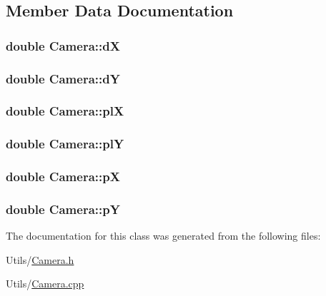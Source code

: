 \subsection{Member Data Documentation}
\hypertarget{classCamera_a3d9d9b2077ddfcd90eb887f0fa472986}{
\subsubsection[{d\-X}]{\setlength{\rightskip}{0pt plus 5cm}double Camera\-::d\-X}}\label{classCamera_a3d9d9b2077ddfcd90eb887f0fa472986}
\hypertarget{classCamera_a21a394585a8f656fbe39c06575afa62e}{
\subsubsection[{d\-Y}]{\setlength{\rightskip}{0pt plus 5cm}double Camera\-::d\-Y}}\label{classCamera_a21a394585a8f656fbe39c06575afa62e}
\hypertarget{classCamera_a724db0b967f04e90c0c17c8fd9301d43}{
\subsubsection[{pl\-X}]{\setlength{\rightskip}{0pt plus 5cm}double Camera\-::pl\-X}}\label{classCamera_a724db0b967f04e90c0c17c8fd9301d43}
\hypertarget{classCamera_a34e29ef2ecb4a278a91aec6db4e9f412}{
\subsubsection[{pl\-Y}]{\setlength{\rightskip}{0pt plus 5cm}double Camera\-::pl\-Y}}\label{classCamera_a34e29ef2ecb4a278a91aec6db4e9f412}
\hypertarget{classCamera_abe152acfd445ee3ab8ab54bc4053a4b3}{
\subsubsection[{p\-X}]{\setlength{\rightskip}{0pt plus 5cm}double Camera\-::p\-X}}\label{classCamera_abe152acfd445ee3ab8ab54bc4053a4b3}
\hypertarget{classCamera_ab6307d4358b77bf4200c6eb6643fed75}{
\subsubsection[{p\-Y}]{\setlength{\rightskip}{0pt plus 5cm}double Camera\-::p\-Y}}\label{classCamera_ab6307d4358b77bf4200c6eb6643fed75}


The documentation for this class was generated from the following files\-:\begin{DoxyCompactItemize}
\item 
Utils/\hyperlink{Camera_8h}{Camera.\-h}\item 
Utils/\hyperlink{Camera_8cpp}{Camera.\-cpp}\end{DoxyCompactItemize}

